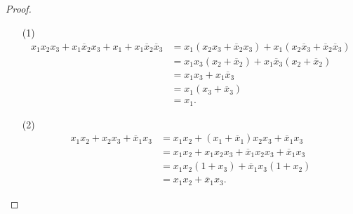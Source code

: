\documentclass[UTF8]{ctexart}
\begin{document}
\subsection{}   %
\begin{proof}
    \begin{enumerate}
        \item []
        \item [(1)]
        \begin{align*}
            x_1 x_2 x_3 + x_1 \overline{x}_2 x_3 + x_1  + x_1 \overline{x}_2 \overline{x}_3
            & =
            x_1 \left(x_2 x_3 + \overline{x}_2 x_3\right)+ x_1 \left(x_2 \overline{x}_3 + \overline{x}_2 \overline{x}_3 \right)\\
            & =
            x_1 x_3 \left(x_2 + \overline{x}_2 \right)+ x_1 \overline{x}_3 \left(x_2 + \overline{x}_2 \right)\\
            & =
            x_1 x_3 + x_1 \overline{x}_3\\
            & =
            x_1 \left(x_3 + \overline{x}_3 \right)\\
            & =
            x_1 .
        \end{align*}
        \item [(2)]
        \begin{align*}
            x_1 x_2 + x_2 x_3 + \overline{x}_1 x_3
            & =
            x_1 x_2 + (x_1 + \overline{x}_1)x_2 x_3 + \overline{x}_1 x_3\\
            & =
            x_1 x_2 + x_1 x_2 x_3 + \overline{x}_1 x_2 x_3 + \overline{x}_1 x_3\\
            & =
            x_1 x_2 (1 + x_3) + \overline{x}_1 x_3 (1 + x_2)\\
            & =
            x_1 x_2 + \overline{x}_1 x_3 .
        \end{align*}
    \end{enumerate}    
\end{proof}
\end{document}
